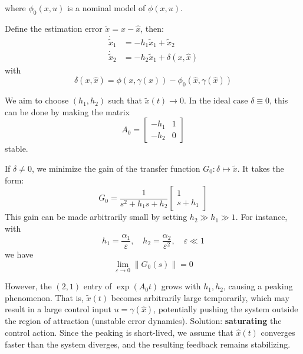 where $\phi_0(x, u)$ is a nominal model of $\phi(x, u)$.

\newpar{}

Define the estimation error $\tilde{x} = x - \hat{x}$, then:
\begin{align*}
    \dot{\tilde{x}}_1 & = -h_1 \tilde{x}_1 + \tilde{x}_2        \\
    \dot{\tilde{x}}_2 & = -h_2 \tilde{x}_1 + \delta(x, \hat{x})
\end{align*}
with
\begin{equation*}
    \delta(x, \hat{x}) = \phi(x, \gamma(x)) - \phi_0(\hat{x}, \gamma(\hat{x}))
\end{equation*}

\newpar{}

We aim to choose $(h_1, h_2)$ such that $\tilde{x}(t) \to 0$. In the ideal case $\delta \equiv 0$, this can be done by making the matrix
\begin{equation*}
    A_0 =
    \begin{bmatrix}
        -h_1 & 1 \\
        -h_2 & 0
    \end{bmatrix}
\end{equation*}
stable.

\newpar{}
If $\delta \neq 0$, we minimize the gain of the transfer function $G_0 : \delta \mapsto \tilde{x}$. It takes the form:
\begin{equation*}
    G_0 =
    \frac{1}{s^2 + h_1 s + h_2}
    \begin{bmatrix}
        1 \\
        s + h_1
    \end{bmatrix}
\end{equation*}
This gain can be made arbitrarily small by setting $h_2 \gg h_1 \gg 1$. For instance, with
\begin{equation*}
    h_1 = \frac{\alpha_1}{\varepsilon}, \quad h_2 = \frac{\alpha_2}{\varepsilon^2}, \quad \varepsilon \ll 1
\end{equation*}
we have
\begin{equation*}
    \lim_{\varepsilon \to 0} \|G_0(s)\| = 0
\end{equation*}

\newpar{}

However, the $(2,1)$ entry of $\exp(A_0 t)$ grows with $h_1, h_2$, causing a peaking phenomenon. That is, $\tilde{x}(t)$ becomes arbitrarily large temporarily, which may result in a large control input $u = \gamma(\hat{x})$, potentially pushing the system outside the region of attraction (unstable error dynamics).
\newpar{}
Solution: \textbf{saturating} the control action. Since the peaking is short-lived, we assume that $\hat{x}(t)$ converges faster than the system diverges, and the resulting feedback remains stabilizing.


